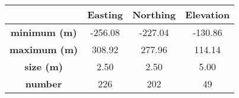 \begin{tabular}{cccc}
\toprule
{} & Easting & Northing & Elevation \\
\midrule
\textbf{minimum (m)} & -256.08 &  -227.04 &   -130.86 \\
\textbf{maximum (m)} &  308.92 &   277.96 &    114.14 \\
\textbf{size (m)   } &    2.50 &     2.50 &      5.00 \\
\textbf{number     } &     226 &      202 &        49 \\
\bottomrule
\end{tabular}
